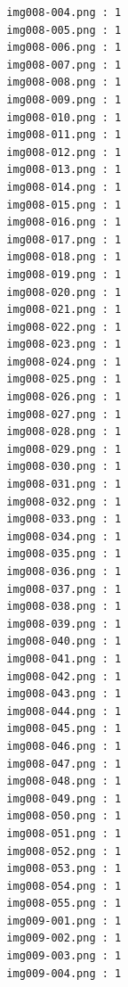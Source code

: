 \documentclass[12pt,a4paper]{article}
\begin{document}
\begin{lstlisting}
                     img008-004.png : 1
                     img008-005.png : 1
                     img008-006.png : 1
                     img008-007.png : 1
                     img008-008.png : 1
                     img008-009.png : 1
                     img008-010.png : 1
                     img008-011.png : 1
                     img008-012.png : 1
                     img008-013.png : 1
                     img008-014.png : 1
                     img008-015.png : 1
                     img008-016.png : 1
                     img008-017.png : 1
                     img008-018.png : 1
                     img008-019.png : 1
                     img008-020.png : 1
                     img008-021.png : 1
                     img008-022.png : 1
                     img008-023.png : 1
                     img008-024.png : 1
                     img008-025.png : 1
                     img008-026.png : 1
                     img008-027.png : 1
                     img008-028.png : 1
                     img008-029.png : 1
                     img008-030.png : 1
                     img008-031.png : 1
                     img008-032.png : 1
                     img008-033.png : 1
                     img008-034.png : 1
                     img008-035.png : 1
                     img008-036.png : 1
                     img008-037.png : 1
                     img008-038.png : 1
                     img008-039.png : 1
                     img008-040.png : 1
                     img008-041.png : 1
                     img008-042.png : 1
                     img008-043.png : 1
                     img008-044.png : 1
                     img008-045.png : 1
                     img008-046.png : 1
                     img008-047.png : 1
                     img008-048.png : 1
                     img008-049.png : 1
                     img008-050.png : 1
                     img008-051.png : 1
                     img008-052.png : 1
                     img008-053.png : 1
                     img008-054.png : 1
                     img008-055.png : 1
                     img009-001.png : 1
                     img009-002.png : 1
                     img009-003.png : 1
                     img009-004.png : 1




\end{lstlisting}
\end{document}
